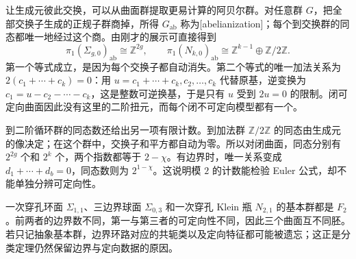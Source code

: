 让生成元彼此交换，可以从曲面群提取更易计算的阿贝尔群。对任意群 \(G\)，把全部交换子生成的正规子群商掉，所得 \(G_{\mathrm{ab}}\) 称为[abelianization]；每个到交换群的同态都唯一地经过这个商。由刚才的展示可直接得到
\[
	\pi_1(\Sigma_{g,0})_{\mathrm{ab}}\cong\mathbb Z^{2g},\qquad
	\pi_1(N_{k,0})_{\mathrm{ab}}\cong\mathbb Z^{k-1}\oplus\mathbb Z/2\mathbb Z.
\]
第一个等式成立，是因为每个交换子都自动消失。第二个等式的唯一加法关系为 \(2(c_1+\cdots+c_k)=0\)：用 \(u=c_1+\cdots+c_k,c_2,\ldots,c_k\) 代替原基，逆变换为 \(c_1=u-c_2-\cdots-c_k\)，这是整数可逆换基，于是只有 \(u\) 受到 \(2u=0\) 的限制。闭可定向曲面因此没有这里的二阶扭元，而每个闭不可定向模型都有一个。

\ProseParagraphBreak

到二阶循环群的同态数还给出另一项有限计数。到加法群 \(\mathbb Z/2\mathbb Z\) 的同态由生成元的像决定；在这个群中，交换子和平方都自动为零。所以对闭曲面，同态分别有 \(2^{2g}\) 个和 \(2^k\) 个，两个指数都等于 \(2-\chi\)。有边界时，唯一关系变成 \(d_1+\cdots+d_b=0\)，同态数则为 \(2^{1-\chi}\)。这说明模 \(2\) 的计数能检验 Euler 公式，却不能单独分辨可定向性。

\begin{example}\label{g1:exm:surface-group-not-classify}
	一次穿孔环面 \(\Sigma_{1,1}\)、三边界球面 \(\Sigma_{0,3}\) 和一次穿孔 Klein 瓶 \(N_{2,1}\) 的基本群都是 \(F_2\)。前两者的边界数不同，第一与第三者的可定向性不同，因此三个曲面互不同胚。若只记抽象基本群，边界环路对应的共轭类以及定向特征都可能被遗忘；这正是分类定理仍然保留边界与定向数据的原因。
\end{example}
